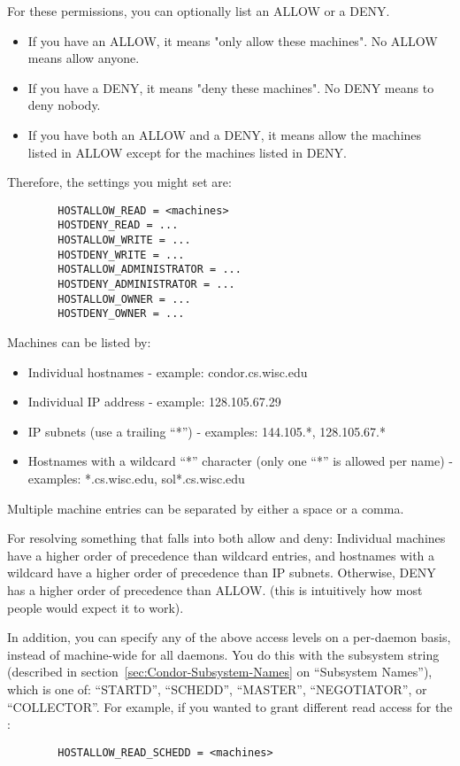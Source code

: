 For these permissions, you can optionally list an ALLOW or a DENY.
\begin{itemize}

\item If you have an ALLOW, it means "only allow these machines".  No
    ALLOW means allow anyone.

\item If you have a DENY, it means "deny these machines".  No DENY
    means to deny nobody.

\item If you have both an ALLOW and a DENY, it means allow the
    machines listed in ALLOW except for the machines listed in DENY.
\end{itemize}

Therefore, the settings you might set are:
\begin{verbatim}
        HOSTALLOW_READ = <machines>
        HOSTDENY_READ = ...
        HOSTALLOW_WRITE = ...
        HOSTDENY_WRITE = ...
        HOSTALLOW_ADMINISTRATOR = ...
        HOSTDENY_ADMINISTRATOR = ...
        HOSTALLOW_OWNER = ...
        HOSTDENY_OWNER = ...
\end{verbatim}

Machines can be listed by:

\begin{itemize}
\item Individual hostnames - example: condor.cs.wisc.edu
\item Individual IP address - example: 128.105.67.29
\item IP subnets (use a trailing ``*'') - examples: 144.105.*, 128.105.67.*
\item Hostnames with a wildcard ``*'' character (only one ``*'' is
    allowed per name) - examples: *.cs.wisc.edu, sol*.cs.wisc.edu
\end{itemize}

Multiple machine entries can be separated by either a space or a comma.

For resolving something that falls into both allow and deny: Individual
machines have a higher order of precedence than wildcard entries, and
hostnames with a wildcard have a higher order of precedence than IP
subnets.  Otherwise, DENY has a higher order of precedence than ALLOW.
(this is intuitively how most people would expect it to work).  

In addition, you can specify any of the above access levels on a
per-daemon basis, instead of machine-wide for all daemons.  You do
this with the subsystem string (described in
section~\ref{sec:Condor-Subsystem-Names} on ``Subsystem Names''),
which is one of: ``STARTD'', ``SCHEDD'', ``MASTER'', ``NEGOTIATOR'',
or ``COLLECTOR''.  For example, if you wanted to grant different read
access for the :
\begin{verbatim}
        HOSTALLOW_READ_SCHEDD = <machines>
\end{verbatim}

